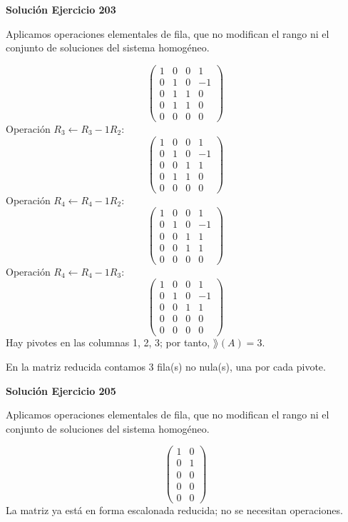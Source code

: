\par\bigskip\noindent\textbf{Solución Ejercicio 203}\par\nobreak
Aplicamos operaciones elementales de fila, que no modifican el rango ni el conjunto de soluciones del sistema homogéneo.

\[
\begin{pmatrix}1&0&0&1\\0&1&0&-1\\0&1&1&0\\0&1&1&0\\0&0&0&0\end{pmatrix}
\]
Operación $R_{3}\leftarrow R_{3}-1R_{2}$:
\[
\begin{pmatrix}1&0&0&1\\0&1&0&-1\\0&0&1&1\\0&1&1&0\\0&0&0&0\end{pmatrix}
\]
Operación $R_{4}\leftarrow R_{4}-1R_{2}$:
\[
\begin{pmatrix}1&0&0&1\\0&1&0&-1\\0&0&1&1\\0&0&1&1\\0&0&0&0\end{pmatrix}
\]
Operación $R_{4}\leftarrow R_{4}-1R_{3}$:
\[
\begin{pmatrix}1&0&0&1\\0&1&0&-1\\0&0&1&1\\0&0&0&0\\0&0&0&0\end{pmatrix}
\]
Hay pivotes en las columnas 1, 2, 3; por tanto, $\boxed{\rang(A)=3}$.

En la matriz reducida contamos 3 fila(s) no nula(s), una por cada pivote.


\par\bigskip\noindent\textbf{Solución Ejercicio 205}\par\nobreak
Aplicamos operaciones elementales de fila, que no modifican el rango ni el conjunto de soluciones del sistema homogéneo.

\[
\begin{pmatrix}1&0\\0&1\\0&0\\0&0\\0&0\end{pmatrix}
\]
La matriz ya está en forma escalonada reducida; no se necesitan operaciones.

